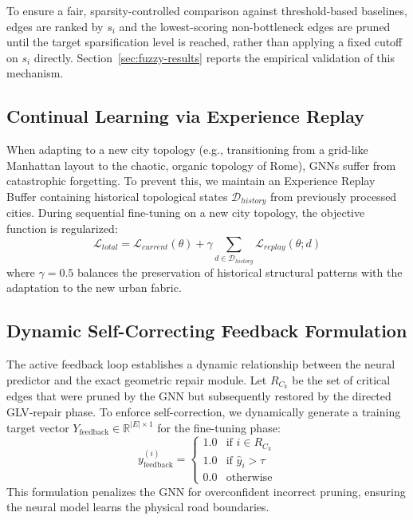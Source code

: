 \documentclass[journal]{IEEEtran}
\begin{document}
To ensure a fair, sparsity-controlled comparison against threshold-based baselines, edges are ranked by $s_i$ and the lowest-scoring non-bottleneck edges are pruned until the target sparsification level is reached, rather than applying a fixed cutoff on $s_i$ directly. Section~\ref{sec:fuzzy-results} reports the empirical validation of this mechanism.

\subsection{Continual Learning via Experience Replay}
When adapting to a new city topology (e.g., transitioning from a grid-like Manhattan layout to the chaotic, organic topology of Rome), GNNs suffer from catastrophic forgetting. To prevent this, we maintain an Experience Replay Buffer containing historical topological states $\mathcal{D}_{history}$ from previously processed cities. During sequential fine-tuning on a new city topology, the objective function is regularized:
\begin{equation}
    \mathcal{L}_{total} = \mathcal{L}_{current}(\theta) + \gamma \sum_{d \in \mathcal{D}_{history}} \mathcal{L}_{replay}(\theta; d)
\end{equation}
where $\gamma = 0.5$ balances the preservation of historical structural patterns with the adaptation to the new urban fabric.

\subsection{Dynamic Self-Correcting Feedback Formulation}
\label{sec:feedback}
The active feedback loop establishes a dynamic relationship between the neural predictor and the exact geometric repair module. Let $R_{C_k}$ be the set of critical edges that were pruned by the GNN but subsequently restored by the directed GLV-repair phase. To enforce self-correction, we dynamically generate a training target vector $Y_{\text{feedback}} \in \mathbb{R}^{|E| \times 1}$ for the fine-tuning phase:
\begin{equation}
    y_{\text{feedback}}^{(i)} =
    \begin{cases}
      1.0 & \text{if } i \in R_{C_k} \\
      1.0 & \text{if } \hat{y}_i > \tau \\
      0.0 & \text{otherwise}
    \end{cases}
\end{equation}
This formulation penalizes the GNN for overconfident incorrect pruning, ensuring the neural model learns the physical road boundaries.
\end{document}
